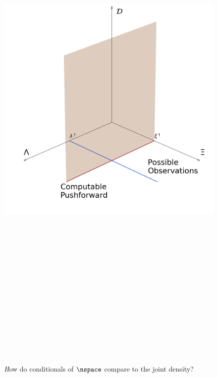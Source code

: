     \begin{figure}
        \includegraphics[height=27cm]{diagram}
    \caption*{\large \emph How do conditionals of $\nspace$ compare to the joint density?}
    \end{figure}

